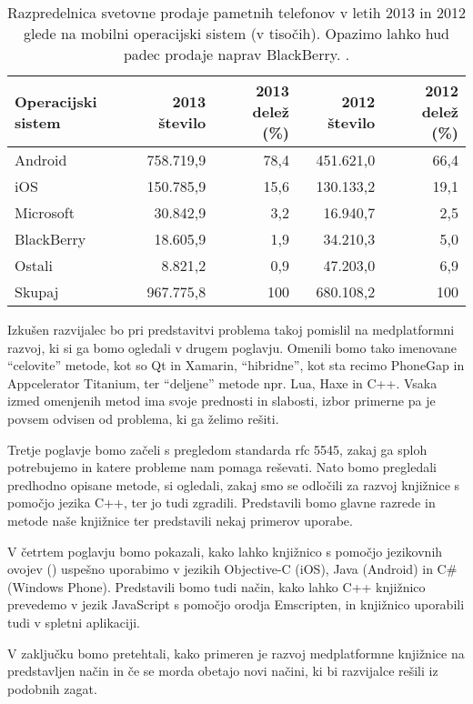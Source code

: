 \begin{table}
\begin{tabular}{ l | r | r | r | r }
  \hline
  Operacijski sistem & 2013 število & 2013 delež (\%) & 2012 število & 2012 delež (\%) \\
  \hline
  Android		& 758.719,9 & 78,4 & 451.621,0 & 66,4 \\
  iOS			& 150.785,9 & 15,6 & 130.133,2 & 19,1 \\
  Microsoft		& 30.842,9  & 3,2  & 16.940,7  & 2,5  \\
  BlackBerry	& 18.605,9  & 1,9  & 34.210,3  & 5,0  \\
  Ostali		& 8.821,2   & 0,9  & 47.203,0  & 6,9  \\
  \hline
  Skupaj		& 967.775,8 & 100  & 680.108,2 & 100  \\
  \hline
\end{tabular}
\caption{Razpredelnica svetovne prodaje pametnih telefonov v letih 2013 in 2012 glede na mobilni operacijski sistem (v tisočih). Opazimo lahko hud padec prodaje naprav BlackBerry. \cite{gartner-mobile-numbers}.}
\label{table:prodaja-mobilnih-naprav}
\end{table}

Izkušen razvijalec bo pri predstavitvi problema takoj pomislil na medplatformni razvoj, ki si ga bomo ogledali v drugem poglavju. Omenili bomo tako imenovane ``celovite'' metode, kot so Qt\cite{qt} in Xamarin\cite{xamarin}, ``hibridne'', kot sta recimo PhoneGap\cite{phonegap} in Appcelerator Titanium\cite{titanium}, ter ``deljene'' metode npr. Lua\cite{lua}, Haxe\cite{haxe} in C++\cite{cpp}. Vsaka izmed omenjenih metod ima svoje prednosti in slabosti, izbor primerne pa je povsem odvisen od problema, ki ga želimo rešiti.

Tretje poglavje bomo začeli s pregledom standarda \gls{rfc} 5545\cite{rfc5545}, zakaj ga sploh potrebujemo in katere probleme nam pomaga reševati. Nato bomo pregledali predhodno opisane metode, si ogledali, zakaj smo se odločili za razvoj knjižnice s pomočjo jezika C++, ter jo tudi zgradili. Predstavili bomo glavne razrede in metode naše knjižnice ter predstavili nekaj primerov uporabe.

V četrtem poglavju bomo pokazali, kako lahko knjižnico s pomočjo jezikovnih ovojev () uspešno uporabimo v jezikih Objective-C (iOS), Java (Android) in C\# (Windows Phone). Predstavili bomo tudi način, kako lahko C++ knjižnico prevedemo v jezik JavaScript s pomočjo orodja Emscripten\cite{emscripten}, in knjižnico uporabili tudi v spletni aplikaciji.

V zaključku bomo pretehtali, kako primeren je razvoj medplatformne knjižnice na predstavljen način in če se morda obetajo novi načini, ki bi razvijalce rešili iz podobnih zagat.
